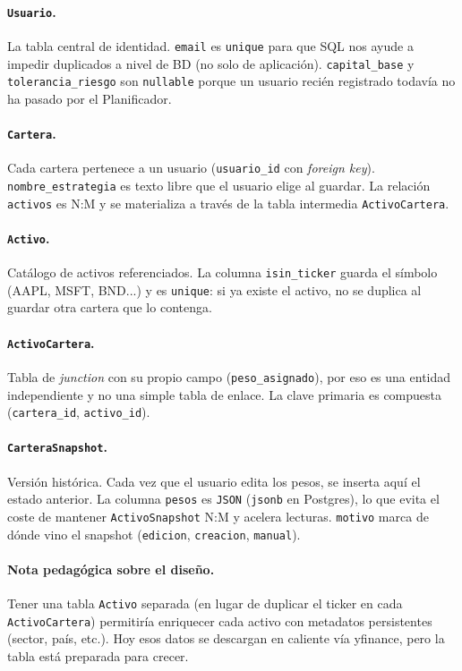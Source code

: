 \documentclass[11pt,a4paper]{book}
\begin{document}
\paragraph{\texttt{Usuario}.} La tabla central de identidad. \texttt{email} es \texttt{unique} para que SQL nos ayude a impedir duplicados a nivel de BD (no solo de aplicación). \texttt{capital\_base} y \texttt{tolerancia\_riesgo} son \texttt{nullable} porque un usuario recién registrado todavía no ha pasado por el Planificador.

\paragraph{\texttt{Cartera}.} Cada cartera pertenece a un usuario (\texttt{usuario\_id} con \textit{foreign key}). \texttt{nombre\_estrategia} es texto libre que el usuario elige al guardar. La relación \texttt{activos} es N:M y se materializa a través de la tabla intermedia \texttt{ActivoCartera}.

\paragraph{\texttt{Activo}.} Catálogo de activos referenciados. La columna \texttt{isin\_ticker} guarda el símbolo (AAPL, MSFT, BND...) y es \texttt{unique}: si ya existe el activo, no se duplica al guardar otra cartera que lo contenga.

\paragraph{\texttt{ActivoCartera}.} Tabla de \emph{junction} con su propio campo (\texttt{peso\_asignado}), por eso es una entidad independiente y no una simple tabla de enlace. La clave primaria es compuesta (\texttt{cartera\_id}, \texttt{activo\_id}).

\paragraph{\texttt{CarteraSnapshot}.} Versión histórica. Cada vez que el usuario edita los pesos, se inserta aquí el estado anterior. La columna \texttt{pesos} es \texttt{JSON} (\texttt{jsonb} en Postgres), lo que evita el coste de mantener \texttt{ActivoSnapshot} N:M y acelera lecturas. \texttt{motivo} marca de dónde vino el snapshot (\texttt{edicion}, \texttt{creacion}, \texttt{manual}).

\paragraph{Nota pedagógica sobre el diseño.} Tener una tabla \texttt{Activo} separada (en lugar de duplicar el ticker en cada \texttt{ActivoCartera}) permitiría enriquecer cada activo con metadatos persistentes (sector, país, etc.). Hoy esos datos se descargan en caliente vía yfinance, pero la tabla está preparada para crecer.
\end{document}
